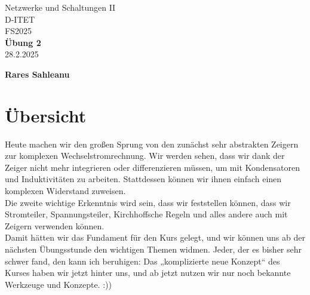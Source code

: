 \documentclass[11pt,a4paper]{article}
\title{}
\date{}  %
\def \autor{Rares Sahleanu}
\def \uebung{Übung 2}
\begin{document}
\begin{titlepage}
	\centering
	{\Huge Netzwerke und Schaltungen II}\\[0.8cm]
	{\Large D-ITET}\\[0.8cm]
	{\Large FS2025}\\[3.5cm]

	{\Huge \textbf{\uebung}}\\[1cm]
	{\Large 28.2.2025}\\[3.5cm]


	\vfill
	{\Large \textbf{\autor}}
\end{titlepage}

\newpage

\newpage
\pagestyle{fancy}

\fancyhead[C]{\small \textit{\uebung}}
\fancyhead[R]{\small \textit{\autor}}

\fancyfoot[L]{}
\fancyfoot[C]{\thepage}
\fancyfoot[R]{}

\renewcommand{\headrulewidth}{0.4pt}
\renewcommand{\footrulewidth}{0pt}


\section{Übersicht}  
Heute machen wir den großen Sprung von den zunächst sehr abstrakten Zeigern zur komplexen Wechselstromrechnung. Wir werden sehen, dass wir dank der Zeiger nicht mehr integrieren oder differenzieren müssen, um mit Kondensatoren und Induktivitäten zu arbeiten. Stattdessen können wir ihnen einfach einen komplexen Widerstand zuweisen. \\

Die zweite wichtige Erkenntnis wird sein, dass wir feststellen können, dass wir Stromteiler, Spannungsteiler, Kirchhoffsche Regeln und alles andere auch mit Zeigern verwenden können. \\

Damit hätten wir das Fundament für den Kurs gelegt, und wir können uns ab der nächsten Übungsstunde den wichtigen Themen widmen. Jeder, der es bisher sehr schwer fand, den kann ich beruhigen: Das „komplizierte neue Konzept“ des Kurses haben wir jetzt hinter uns, und ab jetzt nutzen wir nur noch bekannte Werkzeuge und Konzepte. :))
\end{document}
